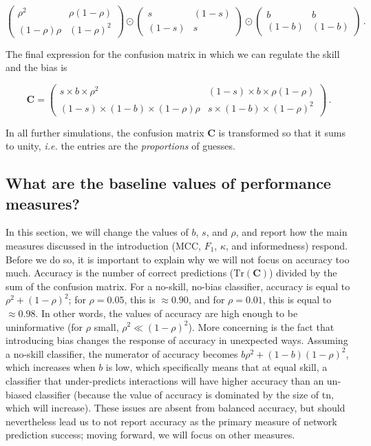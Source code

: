 \documentclass[11pt]{article}
\begin{document}
\[
\begin{pmatrix}
    \rho^2 & \rho (1-\rho) \\
    (1-\rho) \rho & (1-\rho)^2
\end{pmatrix} \odot \begin{pmatrix}
    s & (1-s) \\
    (1-s) & s
\end{pmatrix} \odot \begin{pmatrix}
    b & b \\
    (1-b) & (1-b)
\end{pmatrix}\,.
\]

The final expression for the confusion matrix in which we can regulate
the skill and the bias is

\[
\mathbf{C} = \begin{pmatrix}
    s\times b\times \rho^2 & (1-s)\times b\times \rho (1-\rho) \\
    (1-s)\times (1-b)\times (1-\rho) \rho & s\times (1-b)\times (1-\rho)^2
\end{pmatrix} \,.
\]

In all further simulations, the confusion matrix \(\mathbf{C}\) is
transformed so that it sums to unity, \emph{i.e.} the entries are the
\emph{proportions} of guesses.

\hypertarget{what-are-the-baseline-values-of-performance-measures}{%
\subsection{What are the baseline values of performance
measures?}\label{what-are-the-baseline-values-of-performance-measures}}

In this section, we will change the values of \(b\), \(s\), and
\(\rho\), and report how the main measures discussed in the introduction
(MCC, \(F_1\), \(\kappa\), and informedness) respond. Before we do so,
it is important to explain why we will not focus on accuracy too much.
Accuracy is the number of correct predictions
(\(\text{Tr}(\mathbf{C})\)) divided by the sum of the confusion matrix.
For a no-skill, no-bias classifier, accuracy is equal to
\(\rho^2 + (1-\rho)^2\); for \(\rho = 0.05\), this is \(\approx 0.90\),
and for \(\rho = 0.01\), this is equal to \(\approx 0.98\). In other
words, the values of accuracy are high enough to be uninformative (for
\(\rho\) small, \(\rho^2 \ll (1-\rho)^2\)). More concerning is the fact
that introducing bias changes the response of accuracy in unexpected
ways. Assuming a no-skill classifier, the numerator of accuracy becomes
\(b\rho^2 + (1-b)(1-\rho)^2\), which increases when \(b\) is low, which
specifically means that at equal skill, a classifier that under-predicts
interactions will have higher accuracy than an un-biased classifier
(because the value of accuracy is dominated by the size of tn, which
will increase). These issues are absent from balanced accuracy, but
should nevertheless lead us to not report accuracy as the primary
measure of network prediction success; moving forward, we will focus on
other measures.
\end{document}
